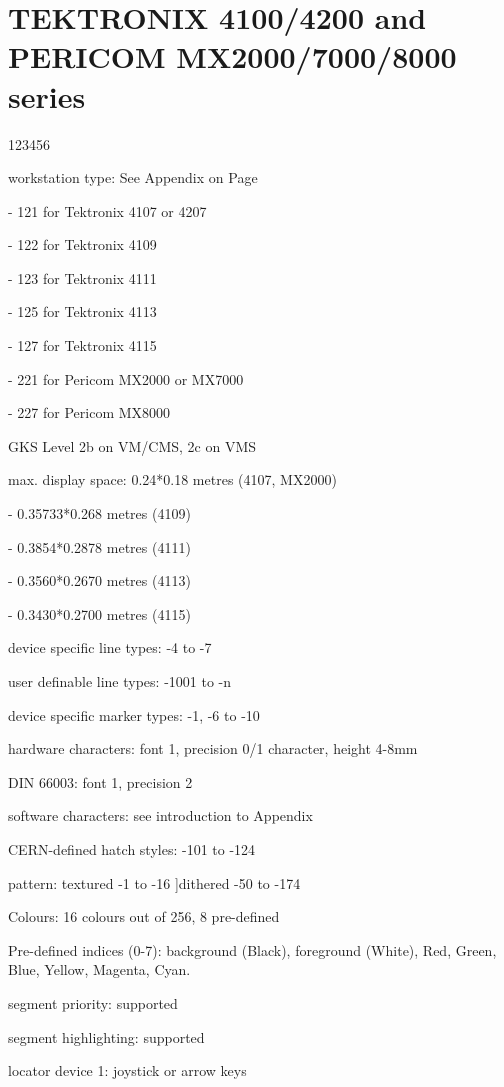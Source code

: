 \section{TEKTRONIX 4100/4200 and PERICOM MX2000/7000/8000 series}
\begin{DLtt}{123456}
\item[workstation type:]See Appendix on Page~\pageref{sec:gtstyp}
\item[-]121 for Tektronix 4107 or 4207
\item[-]122 for Tektronix 4109
\item[-]123 for Tektronix 4111
\item[-]125 for Tektronix 4113
\item[-]127 for Tektronix 4115
\item[-]221 for Pericom MX2000 or MX7000
\item[-]227 for Pericom MX8000
\item[GKS Level]2b on VM/CMS, 2c on VMS
\item[max. display space:]0.24*0.18 metres (4107, MX2000)
\item[-]0.35733*0.268 metres (4109)
\item[-]0.3854*0.2878 metres (4111)
\item[-]0.3560*0.2670 metres (4113)
\item[-]0.3430*0.2700 metres (4115)
\item[device specific line types:]-4 to -7
\item[user definable line types:]-1001 to -n
\item[device specific marker types:]-1, -6 to -10
\item[hardware characters:]font 1, precision 0/1 character, height 4-8mm
\item[DIN 66003:]font 1, precision 2
\item[software characters:]see introduction to Appendix
\item[CERN-defined hatch styles:]-101 to -124
\item[pattern:]textured -1 to -16 ]dithered -50 to -174
\item[Colours:]16 colours out of 256, 8 pre-defined
\item[Pre-defined indices (0-7):]background (Black), foreground (White), Red,
Green, Blue, Yellow, Magenta, Cyan.
\item[segment priority:]supported
\item[segment highlighting:]supported
\item[locator device 1:]joystick or arrow keys

\end{DLtt}
